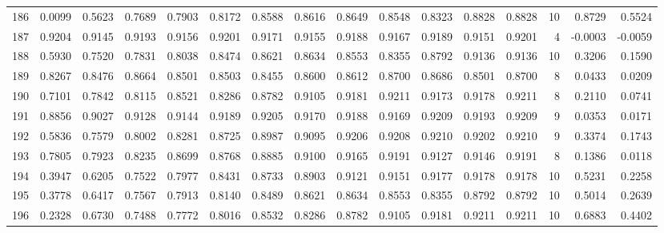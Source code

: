 \begin{tabular}{lrrrrrrrrrrrrrrr}
186 &      0.0099 &  0.5623 &  0.7689 &  0.7903 &  0.8172 &  0.8588 &  0.8616 &  0.8649 &  0.8548 &  0.8323 &   0.8828 &     0.8828 &     10 &                    0.8729 &                     0.5524 \\
187 &      0.9204 &  0.9145 &  0.9193 &  0.9156 &  0.9201 &  0.9171 &  0.9155 &  0.9188 &  0.9167 &  0.9189 &   0.9151 &     0.9201 &      4 &                   -0.0003 &                    -0.0059 \\
188 &      0.5930 &  0.7520 &  0.7831 &  0.8038 &  0.8474 &  0.8621 &  0.8634 &  0.8553 &  0.8355 &  0.8792 &   0.9136 &     0.9136 &     10 &                    0.3206 &                     0.1590 \\
189 &      0.8267 &  0.8476 &  0.8664 &  0.8501 &  0.8503 &  0.8455 &  0.8600 &  0.8612 &  0.8700 &  0.8686 &   0.8501 &     0.8700 &      8 &                    0.0433 &                     0.0209 \\
190 &      0.7101 &  0.7842 &  0.8115 &  0.8521 &  0.8286 &  0.8782 &  0.9105 &  0.9181 &  0.9211 &  0.9173 &   0.9178 &     0.9211 &      8 &                    0.2110 &                     0.0741 \\
191 &      0.8856 &  0.9027 &  0.9128 &  0.9144 &  0.9189 &  0.9205 &  0.9170 &  0.9188 &  0.9169 &  0.9209 &   0.9193 &     0.9209 &      9 &                    0.0353 &                     0.0171 \\
192 &      0.5836 &  0.7579 &  0.8002 &  0.8281 &  0.8725 &  0.8987 &  0.9095 &  0.9206 &  0.9208 &  0.9210 &   0.9202 &     0.9210 &      9 &                    0.3374 &                     0.1743 \\
193 &      0.7805 &  0.7923 &  0.8235 &  0.8699 &  0.8768 &  0.8885 &  0.9100 &  0.9165 &  0.9191 &  0.9127 &   0.9146 &     0.9191 &      8 &                    0.1386 &                     0.0118 \\
194 &      0.3947 &  0.6205 &  0.7522 &  0.7977 &  0.8431 &  0.8733 &  0.8903 &  0.9121 &  0.9151 &  0.9177 &   0.9178 &     0.9178 &     10 &                    0.5231 &                     0.2258 \\
195 &      0.3778 &  0.6417 &  0.7567 &  0.7913 &  0.8140 &  0.8489 &  0.8621 &  0.8634 &  0.8553 &  0.8355 &   0.8792 &     0.8792 &     10 &                    0.5014 &                     0.2639 \\
196 &      0.2328 &  0.6730 &  0.7488 &  0.7772 &  0.8016 &  0.8532 &  0.8286 &  0.8782 &  0.9105 &  0.9181 &   0.9211 &     0.9211 &     10 &                    0.6883 &                     0.4402 \\

\end{tabular}
